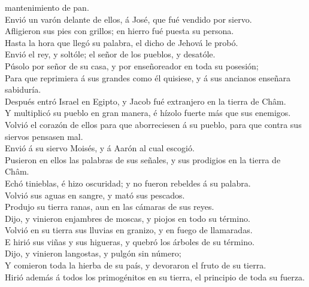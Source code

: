 mantenimiento de pan.\\
 Envió un varón delante de ellos, á José, que fué vendido
por siervo.\\
 Afligieron sus pies con grillos; en hierro fué puesta su
persona.\\
 Hasta la hora que llegó su palabra, el dicho de Jehová
le probó.\\
 Envió el rey, y soltóle; el señor de los pueblos, y
desatóle.\\
 Púsolo por señor de su casa, y por enseñoreador en toda
su posesión;\\
 Para que reprimiera á sus grandes como él quisiese, y á
sus ancianos enseñara sabiduría.\\
 Después entró Israel en Egipto, y Jacob fué extranjero
en la tierra de Châm.\\
 Y multiplicó su pueblo en gran manera, é hízolo fuerte
más que sus enemigos.\\
 Volvió el corazón de ellos para que aborreciesen á su
pueblo, para que contra sus siervos pensasen mal.\\
 Envió á su siervo Moisés, y á Aarón al cual escogió.\\
 Pusieron en ellos las palabras de sus señales, y sus
prodigios en la tierra de Châm.\\
 Echó tinieblas, é hizo oscuridad; y no fueron rebeldes á
su palabra.\\
 Volvió sus aguas en sangre, y mató sus pescados.\\
 Produjo su tierra ranas, aun en las cámaras de sus
reyes.\\
 Dijo, y vinieron enjambres de moscas, y piojos en todo
su término.\\
 Volvió en su tierra sus lluvias en granizo, y en fuego
de llamaradas.\\
 E hirió sus viñas y sus higueras, y quebró los árboles
de su término.\\
 Dijo, y vinieron langostas, y pulgón sin número;\\
 Y comieron toda la hierba de su país, y devoraron el
fruto de su tierra.\\
 Hirió además á todos los primogénitos en su tierra, el
principio de toda su fuerza.\\
